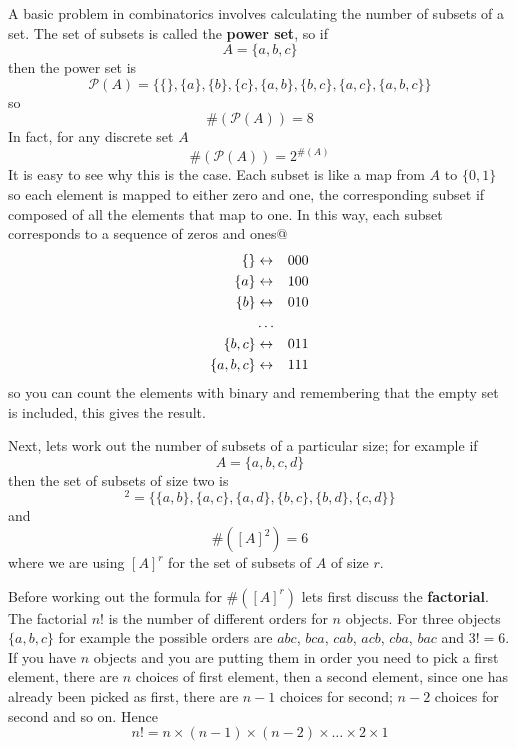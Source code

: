 \documentclass[11pt,a4paper]{scrartcl}
\begin{document}
A basic problem in combinatorics involves calculating the number of
subsets of a set. The set of subsets is called the \textbf{power set},
so if
\begin{equation}
  A=\{a,b,c\}
\end{equation}
then the power set is
\begin{equation}
    \mathcal{P}(A)=\{\{\},\{a\},\{b\},\{c\},\{a,b\},\{b,c\},\{a,c\},\{a,b,c\}\}
\end{equation}
so
\begin{equation}
  \#(\mathcal{P}(A))=8
\end{equation}
In fact, for any discrete set $A$
\begin{equation}
  \#(\mathcal{P}(A))=2^{\#(A)}
\end{equation}
It is easy to see why this is the case. Each subset is like a map from
$A$ to $\{0,1\}$ so each element is mapped to either zero and one, the
corresponding subset if composed of all the elements that map to
one. In this way, each subset corresponds to a sequence of zeros and ones@
\begin{eqnarray}
  \{\}&\leftrightarrow&000\cr
  \{a\}&\leftrightarrow&100\cr
  \{b\}&\leftrightarrow&010\cr
  &\ldots&\cr
  \{b,c\}&\leftrightarrow&011\cr
  \{a,b,c\}&\leftrightarrow&111
\end{eqnarray}
so you can count the elements with binary and remembering that the
empty set is included, this gives the result.

Next, lets work out the number of subsets of a particular size; for example if
\begin{equation}
  A=\{a,b,c,d\}
\end{equation}
then the set of subsets of size two is
\begin{equation}
   [A]^2 =\{\{a,b\},\{a,c\},\{a,d\},\{b,c\},\{b,d\},\{c,d\}\}
\end{equation}
and
\begin{equation}
  \#([A]^2)=6
\end{equation}
where we are using $[A]^r$ for the set of subsets of $A$ of size $r$.


Before working out the formula for $\#([A]^r)$ lets first discuss the
\textbf{factorial}. The factorial $n!$ is the number of different
orders for $n$ objects. For three objects $\{a,b,c\}$ for example the
possible orders are $abc$, $bca$, $cab$, $acb$, $cba$, $bac$ and
$3!=6$. If you have $n$ objects and you are putting them in order you
need to pick a first element, there are $n$ choices of first element,
then a second element, since one has already been picked as first,
there are $n-1$ choices for second; $n-2$ choices for second and so on. Hence
\begin{equation}
  n!=n\times (n-1)\times(n-2)\times\ldots \times2\times 1
\end{equation}
\end{document}
